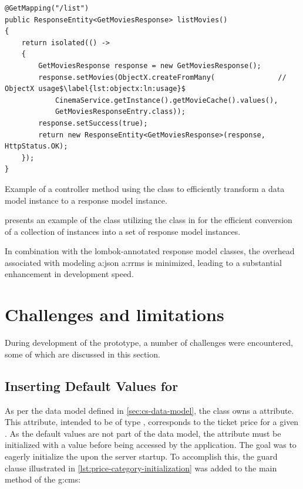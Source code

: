 \begin{listing}[H]
\begin{verbatim}
@GetMapping("/list")
public ResponseEntity<GetMoviesResponse> listMovies() 
{
    return isolated(() -> 
    {
        GetMoviesResponse response = new GetMoviesResponse();
        response.setMovies(ObjectX.createFromMany(               // ObjectX usage$\label{lst:objectx:ln:usage}$
            CinemaService.getInstance().getMovieCache().values(), 
            GetMoviesResponseEntry.class));
        response.setSuccess(true);
        return new ResponseEntity<GetMoviesResponse>(response, HttpStatus.OK);
    });
}
\end{verbatim}
\vspace{-.5cm}
\caption{Example of a controller method using the  class to efficiently transform a data model instance to a response model instance.}
\label{lst:reflective-object-mapping-example}
\end{listing}

 presents an example of the  class utilizing the  class in  for the efficient conversion of a collection of  instances into a set of  response model instances.

In combination with the lombok-annotated response model classes, the overhead associated with modeling \gls{a:json} \glspl{a:rrm} is minimized, leading to a substantial enhancement in development speed.

\section{Challenges and limitations}\label{sec:impl-challenges}

During development of the prototype, a number of challenges were encountered, some of which are discussed in this section.

\subsection{Inserting Default Values for }\label{sec:impl-challenges-price}

As per the data model defined in \cref{sec:cs-data-model}, the  class owns a  attribute. This attribute, intended to be of type , corresponds to the ticket price for a given . As the default values are not part of the data model, the  attribute must be initialized with a value before being accessed by the application. The goal was to eagerly initialize the  upon the server startup. To accomplish this, the guard clause illustrated in \cref{lst:price-category-initialization} was added to the main method of the \gls{g:cms}:

